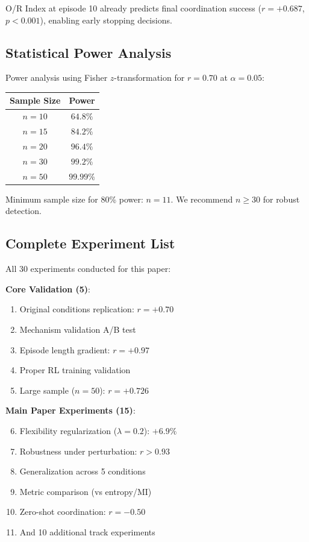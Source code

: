 \documentclass[twoside]{article}
\begin{document}
O/R Index at episode 10 already predicts final coordination success ($r = +0.687$, $p < 0.001$), enabling early stopping decisions.

\subsection{Statistical Power Analysis}

Power analysis using Fisher $z$-transformation for $r = 0.70$ at $\alpha = 0.05$:

\begin{center}
\begin{tabular}{cc}
\toprule
\textbf{Sample Size} & \textbf{Power} \\
\midrule
$n = 10$ & $64.8\%$ \\
$n = 15$ & $84.2\%$ \\
$n = 20$ & $96.4\%$ \\
$n = 30$ & $99.2\%$ \\
$n = 50$ & $99.99\%$ \\
\bottomrule
\end{tabular}
\end{center}

Minimum sample size for 80\% power: $n = 11$. We recommend $n \geq 30$ for robust detection.

\subsection{Complete Experiment List}

All 30 experiments conducted for this paper:

\textbf{Core Validation (5)}:
\begin{enumerate}
    \item Original conditions replication: $r = +0.70$
    \item Mechanism validation A/B test
    \item Episode length gradient: $r = +0.97$
    \item Proper RL training validation
    \item Large sample ($n=50$): $r = +0.726$
\end{enumerate}

\textbf{Main Paper Experiments (15)}:
\begin{enumerate}
    \setcounter{enumi}{5}
    \item Flexibility regularization ($\lambda = 0.2$): $+6.9\%$
    \item Robustness under perturbation: $r > 0.93$
    \item Generalization across 5 conditions
    \item Metric comparison (vs entropy/MI)
    \item Zero-shot coordination: $r = -0.50$
    \item And 10 additional track experiments
\end{enumerate}
\end{document}
